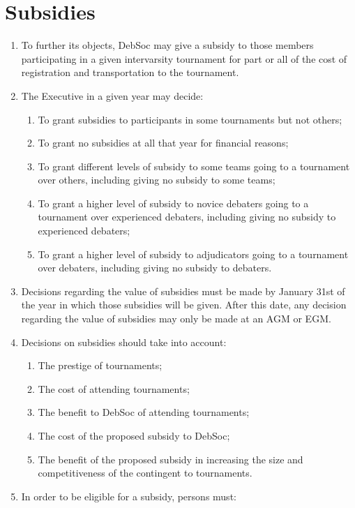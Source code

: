 \newpage
\section{Subsidies}

\begin{enumerate}
\item To further its objects, DebSoc may give a subsidy to those members participating in a given intervarsity tournament for part or all of the cost of registration and transportation to the tournament.
\item The Executive in a given year may decide:
  \begin{enumerate}
  \item To grant subsidies to participants in some tournaments but not others;
  \item To grant no subsidies at all that year for financial reasons;
  \item To grant different levels of subsidy to some teams going to a tournament over others, including giving no subsidy to some teams;
  \item To grant a higher level of subsidy to novice debaters going to a tournament over experienced debaters, including giving no subsidy to experienced debaters;
  \item To grant a higher level of subsidy to adjudicators going to a tournament over debaters, including giving no subsidy to debaters.
  \end{enumerate}
\item Decisions regarding the value of subsidies must be made by January 31st of the year in which those subsidies will be given. After this date, any decision regarding the value of subsidies may only be made at an AGM or EGM. \label{subsidy_determination_deadline}
\item Decisions on subsidies should take into account:
  \begin{enumerate}
  \item The prestige of tournaments;
  \item The cost of attending tournaments;
  \item The benefit to DebSoc of attending tournaments;
  \item The cost of the proposed subsidy to DebSoc;
  \item The benefit of the proposed subsidy in increasing the size and competitiveness of the contingent to tournaments.
  \end{enumerate}
\item In order to be eligible for a subsidy, persons must:

\end{enumerate}
